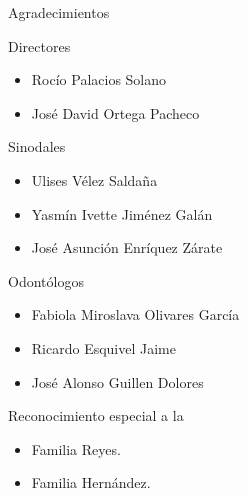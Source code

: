 
\pagestyle{empty}


{\Huge Agradecimientos\par}

\vspace{2em}
{\large Directores\par}
\vspace{1em}

\begin{itemize}
\item Rocío Palacios Solano
\item José David Ortega Pacheco
\end{itemize}

\vspace{1em}
{\large Sinodales\par}
\vspace{1em}

\begin{itemize}
\item Ulises Vélez Saldaña
\item Yasmín Ivette Jiménez Galán
\item José Asunción Enríquez Zárate
\end{itemize}

\vspace{1em}
{\large Odontólogos\par}
\vspace{1em}

\begin{itemize}
\item Fabiola Miroslava Olivares García
\item Ricardo Esquivel Jaime
\item José Alonso Guillen Dolores
\end{itemize}

\vspace{1em}
{\large Reconocimiento especial a la\par}
\vspace{1em}
\begin{itemize}
\item Familia Reyes.
\item Familia Hernández.
\end{itemize}





\newpage